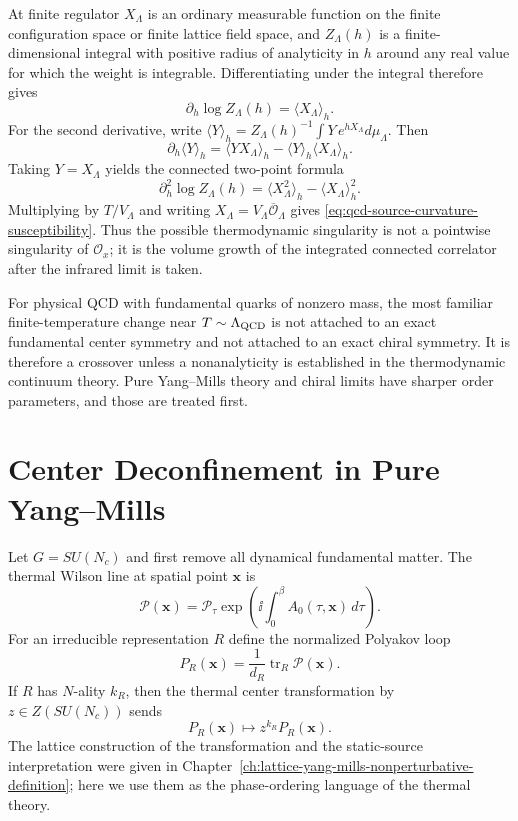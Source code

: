 At finite regulator \(X_\Lambda\) is an ordinary measurable function on the
finite configuration space or finite lattice field space, and \(Z_\Lambda(h)\)
is a finite-dimensional integral with positive radius of analyticity in \(h\)
around any real value for which the weight is integrable.  Differentiating
under the integral therefore gives
\[
  \partial_h\log Z_\Lambda(h)=\langle X_\Lambda\rangle_h .
\]
For the second derivative, write
\(\langle Y\rangle_h=Z_\Lambda(h)^{-1}\int Y\,e^{hX_\Lambda}d\mu_\Lambda\).
Then
\[
  \partial_h\langle Y\rangle_h
  =
  \langle YX_\Lambda\rangle_h
  -
  \langle Y\rangle_h\langle X_\Lambda\rangle_h .
\]
Taking \(Y=X_\Lambda\) yields the connected two-point formula
\[
  \partial_h^2\log Z_\Lambda(h)
  =
  \langle X_\Lambda^2\rangle_h-\langle X_\Lambda\rangle_h^2 .
\]
Multiplying by \(T/V_\Lambda\) and writing
\(X_\Lambda=V_\Lambda\overline{\mathcal O}_\Lambda\) gives
\eqref{eq:qcd-source-curvature-susceptibility}.  Thus the possible
thermodynamic singularity is not a pointwise singularity of
\(\mathcal O_x\); it is the volume growth of the integrated connected
correlator after the infrared limit is taken.

For physical QCD with fundamental quarks of nonzero mass, the most familiar
finite-temperature change near \(T\sim\Lambda_{\rm QCD}\) is not attached to
an exact fundamental center symmetry and not attached to an exact chiral
symmetry.  It is therefore a crossover unless a nonanalyticity is established
in the thermodynamic continuum theory.  Pure Yang--Mills theory and chiral
limits have sharper order parameters, and those are treated first.

\section{Center Deconfinement in Pure Yang--Mills}

Let \(G=SU(N_c)\) and first remove all dynamical fundamental matter.  The
thermal Wilson line at spatial point \(\mathbf x\) is
\begin{equation}
  \mathcal P(\mathbf x)
  =
  \mathcal P_\tau
  \exp\left(\ii\int_0^\beta A_0(\tau,\mathbf x)\,d\tau\right).
  \label{eq:qcd-phase-polyakov-holonomy}
\end{equation}
For an irreducible representation \(R\) define the normalized Polyakov loop
\begin{equation}
  P_R(\mathbf x)=\frac{1}{d_R}\operatorname{tr}_R\mathcal P(\mathbf x).
  \label{eq:qcd-phase-polyakov-loop}
\end{equation}
If \(R\) has \(N\)-ality \(k_R\), then the thermal center transformation by
\(z\in Z(SU(N_c))\) sends
\[
  P_R(\mathbf x)\longmapsto z^{k_R}P_R(\mathbf x).
\]
The lattice construction of the transformation and the static-source
interpretation were given in
Chapter~\ref{ch:lattice-yang-mills-nonperturbative-definition}; here we use
them as the phase-ordering language of the thermal theory.

